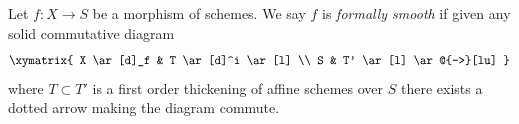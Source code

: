 \begin{definition}
\label{definition-formally-smooth}
Let $f : X \to S$ be a morphism of schemes.
We say $f$ is {\it formally smooth} if given any solid commutative diagram
$$
\xymatrix{
X \ar[d]_f & T \ar[d]^i \ar[l] \\
S & T' \ar[l] \ar@{-->}[lu]
}
$$
where $T \subset T'$ is a first order thickening of affine schemes over $S$
there exists a dotted arrow making the diagram commute.
\end{definition}